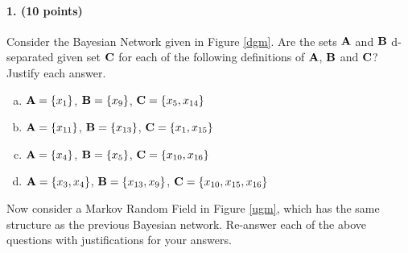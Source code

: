 \documentclass[11pt]{article}
\begin{document}
\paragraph{1. (10 points)} Consider the Bayesian Network given in Figure \ref{dgm}. Are the sets ${\bf A}$ and ${\bf B}$ d-separated given set ${\bf C}$ for each of the following definitions of ${\bf A}$, ${\bf B}$ and ${\bf C}$? Justify each answer.
\begin{enumerate}[a.]
\item ${\bf A} = \{x_1\}$, ${\bf B} = \{x_9\}$, ${\bf C} = \{x_5,x_{14}\}$
\item ${\bf A} = \{x_{11}\}$, ${\bf B} = \{x_{13}\}$, ${\bf C} = \{x_1,x_{15}\}$
\item ${\bf A} = \{x_4\}$, ${\bf B} = \{x_5\}$, ${\bf C} = \{x_{10},x_{16}\}$
\item ${\bf A} = \{x_3, x_4\}$, ${\bf B} = \{x_{13},x_9\}$, ${\bf C} = \{x_{10},x_{15},x_{16}\}$
\end{enumerate}
Now consider a Markov Random Field in Figure \ref{ugm}, which has the same structure as the previous Bayesian network.  Re-answer each of the above questions with justifications for your answers.
\end{document}
